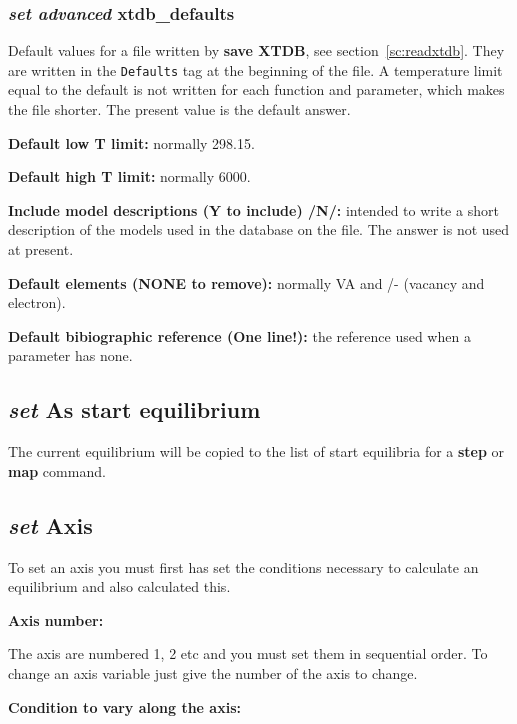 \documentclass[11pt]{article}
\begin{document}
\hypertarget{Set adv xtdb}{}
\subsubsection{{\em set advanced} xtdb\_defaults}

Default values for a file written by {\bf save XTDB}, see
section~\ref{sc:readxtdb}.  They are written in the {\tt Defaults} tag
at the beginning of the file.  A temperature limit equal to the
default is not written for each function and parameter, which makes
the file shorter.  The present value is the default answer.

{\bf Default low T limit:} normally 298.15.

{\bf Default high T limit:} normally 6000.

{\bf Include model descriptions (Y to include) /N/:} intended to write
a short description of the models used in the database on the file.
The answer is not used at present.

{\bf Default elements (NONE to remove):} normally VA and /- (vacancy
and electron).

{\bf Default bibiographic reference (One line!):} the reference used
when a parameter has none.

\hypertarget{Set as start equil}{}
\subsection{{\em set} As start equilibrium}

The current equilibrium will be copied to the list of start equilibria
for a {\bf step} or {\bf map} command.

\hypertarget{Set axis}{}
\subsection{{\em set} Axis}\label{sc:setaxis}

To set an axis you must first has set the conditions necessary to
calculate an equilibrium and also calculated this.

{\bf Axis number:}

The axis are numbered 1, 2 etc and you must set them in sequential
order.  To change an axis variable just give the number of the axis to
change.

{\bf Condition to vary along the axis:}
\end{document}

